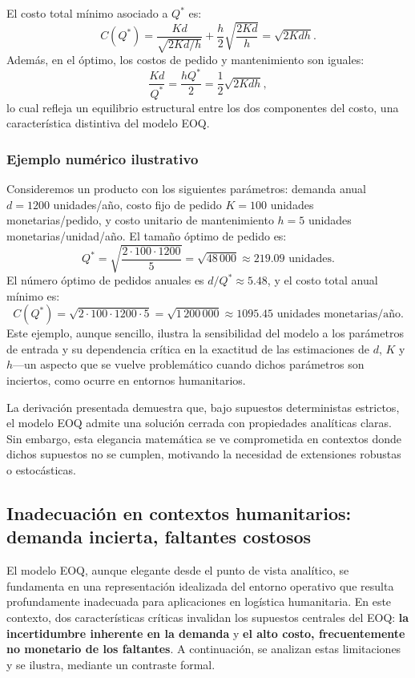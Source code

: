 \documentclass[
  spanish,
  us-letterpaper,
  DIV=11,
  numbers=noendperiod]{scrreprt}
\numberwithin{equation}{section}
\begin{document}
El costo total mínimo asociado a \(Q^*\) es: \[
C(Q^*) = \frac{K d}{\sqrt{2 K d / h}} + \frac{h}{2} \sqrt{\frac{2 K d}{h}}
= \sqrt{2 K d h}.
\] Además, en el óptimo, los costos de pedido y mantenimiento son
iguales: \[
\frac{K d}{Q^*} = \frac{h Q^*}{2} = \frac{1}{2} \sqrt{2 K d h},
\] lo cual refleja un equilibrio estructural entre los dos componentes
del costo, una característica distintiva del modelo EOQ.

\subsubsection{Ejemplo numérico
ilustrativo}\label{ejemplo-numuxe9rico-ilustrativo}

Consideremos un producto con los siguientes parámetros: demanda anual
\(d = 1200\) unidades/año, costo fijo de pedido \(K = 100\) unidades
monetarias/pedido, y costo unitario de mantenimiento \(h = 5\) unidades
monetarias/unidad/año. El tamaño óptimo de pedido es: \[
Q^* = \sqrt{\frac{2 \cdot 100 \cdot 1200}{5}} = \sqrt{48\,000} \approx 219.09 \text{ unidades}.
\] El número óptimo de pedidos anuales es \(d / Q^* \approx 5.48\), y el
costo total anual mínimo es: \[
C(Q^*) = \sqrt{2 \cdot 100 \cdot 1200 \cdot 5} = \sqrt{1\,200\,000} \approx 1095.45 \text{ unidades monetarias/año}.
\] Este ejemplo, aunque sencillo, ilustra la sensibilidad del modelo a
los parámetros de entrada y su dependencia crítica en la exactitud de
las estimaciones de \(d\), \(K\) y \(h\)---un aspecto que se vuelve
problemático cuando dichos parámetros son inciertos, como ocurre en
entornos humanitarios.

La derivación presentada demuestra que, bajo supuestos deterministas
estrictos, el modelo EOQ admite una solución cerrada con propiedades
analíticas claras. Sin embargo, esta elegancia matemática se ve
comprometida en contextos donde dichos supuestos no se cumplen,
motivando la necesidad de extensiones robustas o estocásticas.

\subsection{Inadecuación en contextos humanitarios: demanda incierta,
faltantes
costosos}\label{inadecuaciuxf3n-en-contextos-humanitarios-demanda-incierta-faltantes-costosos}

El modelo EOQ, aunque elegante desde el punto de vista analítico, se
fundamenta en una representación idealizada del entorno operativo que
resulta profundamente inadecuada para aplicaciones en logística
humanitaria. En este contexto, dos características críticas invalidan
los supuestos centrales del EOQ: \textbf{la incertidumbre inherente en
la demanda} y \textbf{el alto costo, frecuentemente no monetario de los
faltantes}. A continuación, se analizan estas limitaciones y se ilustra,
mediante un contraste formal.
\end{document}
